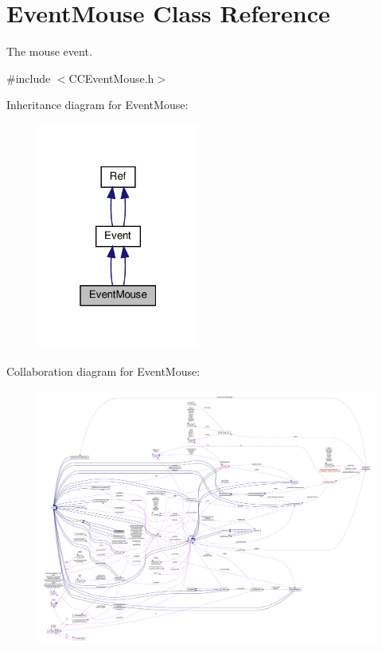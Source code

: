 \hypertarget{classEventMouse}{}\section{Event\+Mouse Class Reference}
\label{classEventMouse}


The mouse event.  




{\ttfamily \#include $<$C\+C\+Event\+Mouse.\+h$>$}



Inheritance diagram for Event\+Mouse\+:
\nopagebreak
\begin{figure}[H]
\begin{center}
\leavevmode
\includegraphics[width=151pt]{classEventMouse__inherit__graph}
\end{center}
\end{figure}


Collaboration diagram for Event\+Mouse\+:
\nopagebreak
\begin{figure}[H]
\begin{center}
\leavevmode
\includegraphics[width=350pt]{classEventMouse__coll__graph}
\end{center}
\end{figure}
